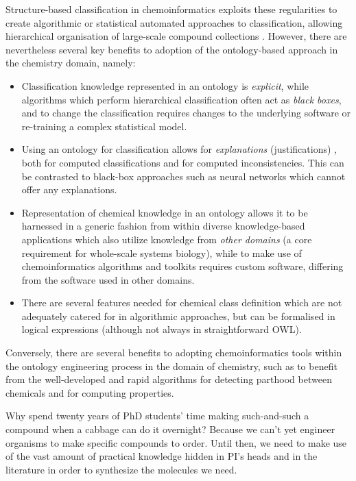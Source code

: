 \documentclass[10pt]{bmc_article}
\newenvironment{bmcformat}{\baselineskip20pt\sloppy\setboolean{publ}{false}}{\baselineskip20pt\sloppy}
\begin{document}
\begin{bmcformat}
Structure-based classification in chemoinformatics exploits these regularities to create algorithmic or statistical automated approaches to classification, allowing hierarchical organisation of large-scale compound collections \cite{barnard1992,deshpande2005}. However, there are nevertheless several key benefits to adoption of the ontology-based approach in the chemistry domain, namely:
\begin{itemize}
	\item Classification knowledge represented in an ontology is \textit{explicit}, while algorithms which perform hierarchical classification often act as \textit{black boxes}, and to change the classification requires changes to the underlying software or re-training a complex statistical model.
	\item Using an ontology for classification allows for \textit{explanations} (justifications) \cite{horridgeentail09}, both for computed classifications and for computed inconsistencies. This can be contrasted to black-box approaches such as neural networks which cannot offer any explanations. 
	\item Representation of chemical knowledge in an ontology allows it to be harnessed in a generic fashion from within diverse knowledge-based applications which also utilize knowledge from \textit{other domains} (a core requirement for whole-scale systems biology), while to make use of chemoinformatics algorithms and toolkits requires custom software, differing from the software used in other domains.
	\item There are several features needed for chemical class definition which are not adequately catered for in algorithmic approaches, but can be formalised in logical expressions (although not always in straightforward OWL). 
\end{itemize}
Conversely, there are several benefits to adopting chemoinformatics tools within the ontology engineering process in the domain of chemistry, such as to benefit from the well-developed and rapid algorithms for detecting parthood between chemicals and for computing properties.



Why spend twenty years of PhD students' time making such-and-such a compound when a cabbage can do it overnight? Because we can't yet engineer organisms to make specific compounds to order. Until then, we need to make use of the vast amount of practical knowledge hidden in PI's heads and in the literature in order to synthesize the molecules we need.


\end{bmcformat}
\end{document}
